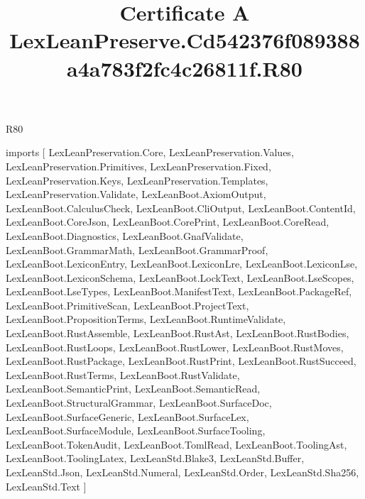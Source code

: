 \begin{lexlean}{R80}
\title{Certificate A LexLeanPreserve.Cd542376f089388a4a783f2fc4c26811f.R80}
\begin{coremodule}
imports [
  LexLeanPreservation.Core,
  LexLeanPreservation.Values,
  LexLeanPreservation.Primitives,
  LexLeanPreservation.Fixed,
  LexLeanPreservation.Keys,
  LexLeanPreservation.Templates,
  LexLeanPreservation.Validate,
  LexLeanBoot.AxiomOutput,
  LexLeanBoot.CalculusCheck,
  LexLeanBoot.CliOutput,
  LexLeanBoot.ContentId,
  LexLeanBoot.CoreJson,
  LexLeanBoot.CorePrint,
  LexLeanBoot.CoreRead,
  LexLeanBoot.Diagnostics,
  LexLeanBoot.GnafValidate,
  LexLeanBoot.GrammarMath,
  LexLeanBoot.GrammarProof,
  LexLeanBoot.LexiconEntry,
  LexLeanBoot.LexiconLre,
  LexLeanBoot.LexiconLse,
  LexLeanBoot.LexiconSchema,
  LexLeanBoot.LockText,
  LexLeanBoot.LseScopes,
  LexLeanBoot.LseTypes,
  LexLeanBoot.ManifestText,
  LexLeanBoot.PackageRef,
  LexLeanBoot.PrimitiveScan,
  LexLeanBoot.ProjectText,
  LexLeanBoot.PropositionTerms,
  LexLeanBoot.RuntimeValidate,
  LexLeanBoot.RustAssemble,
  LexLeanBoot.RustAst,
  LexLeanBoot.RustBodies,
  LexLeanBoot.RustLoops,
  LexLeanBoot.RustLower,
  LexLeanBoot.RustMoves,
  LexLeanBoot.RustPackage,
  LexLeanBoot.RustPrint,
  LexLeanBoot.RustSucceed,
  LexLeanBoot.RustTerms,
  LexLeanBoot.RustValidate,
  LexLeanBoot.SemanticPrint,
  LexLeanBoot.SemanticRead,
  LexLeanBoot.StructuralGrammar,
  LexLeanBoot.SurfaceDoc,
  LexLeanBoot.SurfaceGeneric,
  LexLeanBoot.SurfaceLex,
  LexLeanBoot.SurfaceModule,
  LexLeanBoot.SurfaceTooling,
  LexLeanBoot.TokenAudit,
  LexLeanBoot.TomlRead,
  LexLeanBoot.ToolingAst,
  LexLeanBoot.ToolingLatex,
  LexLeanStd.Blake3,
  LexLeanStd.Buffer,
  LexLeanStd.Json,
  LexLeanStd.Numeral,
  LexLeanStd.Order,
  LexLeanStd.Sha256,
  LexLeanStd.Text
]


\end{coremodule}
\end{lexlean}
